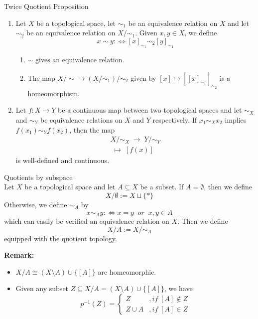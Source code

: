 \begin{proposition}{Twice Quotient Proposition}\\
\begin{enumerate}
    \item Let $X$ be a topological space, let $\sim_1$ be an equivalence relation on $X$ and let $\sim_2$ be an equivalence relation on $X/\sim_1$. Given $x,y \in X$, we define
    $$x \sim y :\Leftrightarrow [x]_{\sim_1} \sim_2 [y]_{\sim_1}$$
    \begin{enumerate}
        \item $\sim$ gives an equivalence relation.
        \item The map $X/\sim \to (X/\sim_{1})/\sim_2$ given by $[x] \mapsto [[x]_{\sim_1}]_{\sim_2}$ is a homeomorphism.
    \end{enumerate}

    \item Let $f:X \to Y$ be a continuous map between two topological spaces and let $\sim_X$ and $\sim_Y$ be equivalence relations on $X$ and $Y$ respectively. If $x_1 \sim_X x_2$ implies $f(x_1) \sim_Y f(x_2)$, then the map
    $$\substack{X/\sim_X \;\to\; Y/\sim_Y\\
    [x] \;\mapsto\; [f(x)]}$$
    is well-defined and continuous.
\end{enumerate}
\end{proposition}

\begin{definition}{Quotients by subspace}\\
Let $X$ be a topological space and let $A \subseteq X$ be a subset. If $A= \emptyset$, then we define
$$X / \emptyset := X \sqcup \{*\}$$
Otherwise, we define $\sim_A$ by
$$x \sim_A y :\Leftrightarrow x=y\;\; or\;\; x,y \in A$$
which can easily be verified an equivalence relation on $X$. Then we define
$$X/ A := X /\sim_A$$
equipped with the quotient topology.
\end{definition}

\noindent\textbf{Remark:} \begin{itemize}
    \item $X /A \cong (X\setminus A) \cup \{[A]\}$ are homeomorphic.
    \item Given any subset $Z \subseteq X/A = (X\setminus A) \cup \{[A]\}$, we have
    $$p^{-1}(Z) =\begin{cases}
        Z &,if\;[A] \notin Z\\
        Z \cup A &,if\; [A] \in Z
    \end{cases}$$
\end{itemize}

